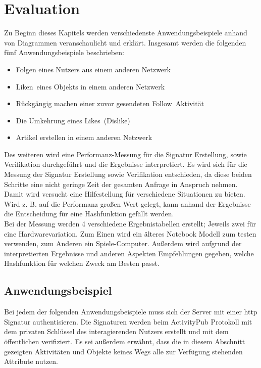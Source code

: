 
\chapter{Evaluation}
\label{ch:Evaluation}
Zu Beginn dieses Kapitels werden verschiedenste Anwendungsbeispiele anhand von Diagrammen veranschaulicht und erklärt. Insgesamt werden die folgenden fünf Anwendungsbeispiele beschrieben:
\begin{itemize}
	\item Folgen eines Nutzers aus einem anderen Netzwerk
	\item \glqq Liken\grqq~eines Objekts in einem anderen Netzwerk
	\item Rückgängig machen einer zuvor gesendeten \glqq Follow\grqq~Aktivität
	\item Die Umkehrung eines \glqq Likes\grqq~(Dislike)
	\item Artikel erstellen in einem anderen Netzwerk
\end{itemize}
Des weiteren wird eine Performanz-Messung für die Signatur Erstellung, sowie Verifikation durchgeführt und die Ergebnisse interpretiert. Es wird sich für die Messung der Signatur Erstellung sowie Verifikation entschieden, da diese beiden Schritte eine nicht geringe Zeit der gesamten Anfrage in Anspruch nehmen. Damit wird versucht eine Hilfestellung für verschiedene Situationen zu bieten. Wird z. B. auf die Performanz großen Wert gelegt, kann anhand der Ergebnisse die Entscheidung für eine Hashfunktion gefällt werden.\\

Bei der Messung werden 4 verschiedene Ergebnistabellen erstellt; Jeweils zwei für eine Hardwarevariation. Zum Einen wird ein älteres Notebook Modell zum testen verwenden, zum Anderen ein Spiele-Computer. Außerdem wird aufgrund der interpretierten Ergebnisse und anderen Aspekten Empfehlungen gegeben, welche Hashfunktion für welchen Zweck am Besten passt.
\section{Anwendungsbeispiel}
Bei jedem der folgenden Anwendungsbeispiele muss sich der Server mit einer \gls{http} Signatur authentisieren. Die Signaturen werden beim ActivityPub Protokoll mit dem privaten Schlüssel des interagierenden Nutzers erstellt und mit dem öffentlichen verifiziert. Es sei außerdem erwähnt, dass die in diesem Abschnitt gezeigten Aktivitäten und Objekte keines Wegs alle zur Verfügung stehenden Attribute nutzen.\\

